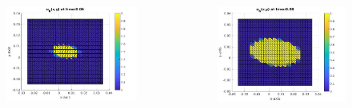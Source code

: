\documentclass[9pt]{beamer}
\begin{document}
\begin{frame}
\begin{columns}
		\begin{column}{0.25\textwidth}
			\begin{figure}[h]
				\includegraphics[width=\textwidth]{tc1-2/006.jpg}
			\end{figure}
		\end{column}
		\begin{column}{0.25\textwidth}
			\begin{figure}[h]
				\includegraphics[width=\textwidth]{tc1-2/008.jpg}
			\end{figure}
		\end{column}
	\end{columns}
	\begin{columns}
		\begin{column}{0.25\textwidth}

\end{column}
\end{columns}
\end{frame}
\end{document}
